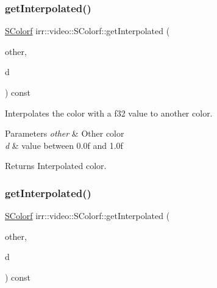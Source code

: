 \subsubsection{\texorpdfstring{get\+Interpolated()}{getInterpolated()}\hspace{0.1cm}{\footnotesize\ttfamily [1/2]}}
{\footnotesize\ttfamily \hyperlink{classirr_1_1video_1_1SColorf}{S\+Colorf} irr\+::video\+::\+S\+Colorf\+::get\+Interpolated (\begin{DoxyParamCaption}\item[{const \hyperlink{classirr_1_1video_1_1SColorf}{S\+Colorf} \&}]{other,  }\item[{\hyperlink{namespaceirr_a0277be98d67dc26ff93b1a6a1d086b07}{f32}}]{d }\end{DoxyParamCaption}) const\hspace{0.3cm}{\ttfamily [inline]}}



Interpolates the color with a f32 value to another color. 


\begin{DoxyParams}{Parameters}
{\em other} & Other color \\
\hline
{\em d} & value between 0.\+0f and 1.\+0f \\
\hline
\end{DoxyParams}
\begin{DoxyReturn}{Returns}
Interpolated color. 
\end{DoxyReturn}
\mbox{\label{classirr_1_1video_1_1SColorf_a43850552a0805bcdb8c246613d251cfb}} 
\subsubsection{\texorpdfstring{get\+Interpolated()}{getInterpolated()}\hspace{0.1cm}{\footnotesize\ttfamily [2/2]}}
{\footnotesize\ttfamily \hyperlink{classirr_1_1video_1_1SColorf}{S\+Colorf} irr\+::video\+::\+S\+Colorf\+::get\+Interpolated (\begin{DoxyParamCaption}\item[{const \hyperlink{classirr_1_1video_1_1SColorf}{S\+Colorf} \&}]{other,  }\item[{\hyperlink{namespaceirr_a0277be98d67dc26ff93b1a6a1d086b07}{f32}}]{d }\end{DoxyParamCaption}) const\hspace{0.3cm}{\ttfamily [inline]}}



